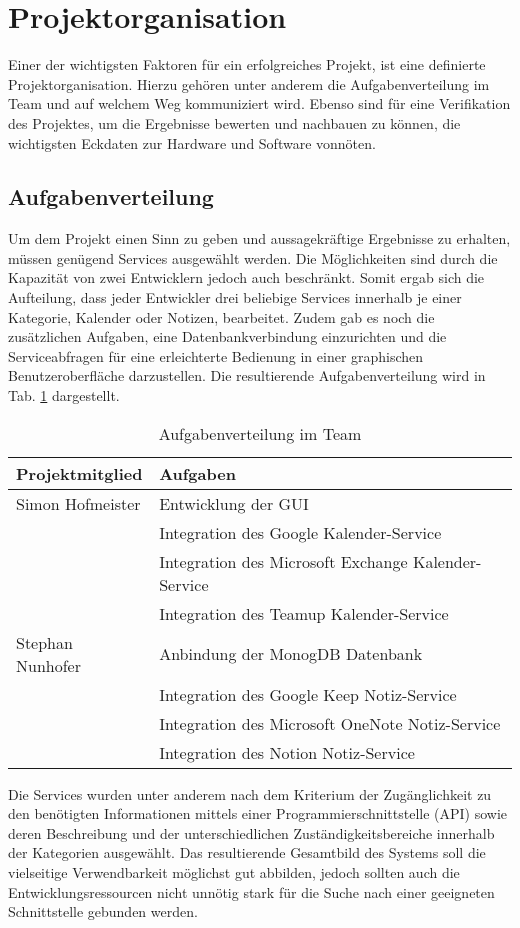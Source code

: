 \section{Projektorganisation}
Einer der wichtigsten Faktoren für ein erfolgreiches Projekt, ist eine definierte Projektorganisation. Hierzu gehören unter anderem die Aufgabenverteilung im Team und auf welchem Weg kommuniziert wird. Ebenso sind für eine Verifikation des Projektes, um die Ergebnisse bewerten und nachbauen zu können, die wichtigsten Eckdaten zur Hardware und Software vonnöten.

\subsection{Aufgabenverteilung}
Um dem Projekt einen Sinn zu geben und aussagekräftige Ergebnisse zu erhalten, müssen genügend Services ausgewählt werden. Die Möglichkeiten sind durch die Kapazität von zwei Entwicklern jedoch auch beschränkt. Somit ergab sich die Aufteilung, dass jeder Entwickler drei beliebige Services innerhalb je einer Kategorie, Kalender oder Notizen, bearbeitet. Zudem gab es noch die zusätzlichen Aufgaben, eine Datenbankverbindung einzurichten und die Serviceabfragen für eine erleichterte Bedienung in einer graphischen Benutzeroberfläche darzustellen. Die resultierende Aufgabenverteilung wird in Tab. \ref{tab:aufgabenverteilung} dargestellt.
\begin{table}[h]
	\caption{Aufgabenverteilung im Team}
	\label{tab:aufgabenverteilung}
		\begin{tabularx}{\textwidth}{ | l | X | }
		\hline
		Projektmitglied & Aufgaben \\ \hline
		Simon Hofmeister & Entwicklung der GUI \\ 
		& Integration des Google Kalender-Service\\ 
		& Integration des Microsoft Exchange Kalender-Service \\ 
		& Integration des Teamup Kalender-Service  \\ \hline
		Stephan Nunhofer & Anbindung der MonogDB Datenbank \\
		&  Integration des Google Keep Notiz-Service\\
		&  Integration des Microsoft OneNote Notiz-Service \\
		&  Integration des Notion Notiz-Service \\ \hline
	\end{tabularx}
\end{table}
Die Services wurden unter anderem nach dem Kriterium der Zugänglichkeit zu den benötigten Informationen mittels einer Programmierschnittstelle (API) sowie deren Beschreibung und der unterschiedlichen Zuständigkeitsbereiche innerhalb der Kategorien ausgewählt. Das resultierende Gesamtbild des Systems soll die vielseitige Verwendbarkeit möglichst gut abbilden, jedoch sollten auch die Entwicklungsressourcen nicht unnötig stark für die Suche nach einer geeigneten Schnittstelle gebunden werden. 

